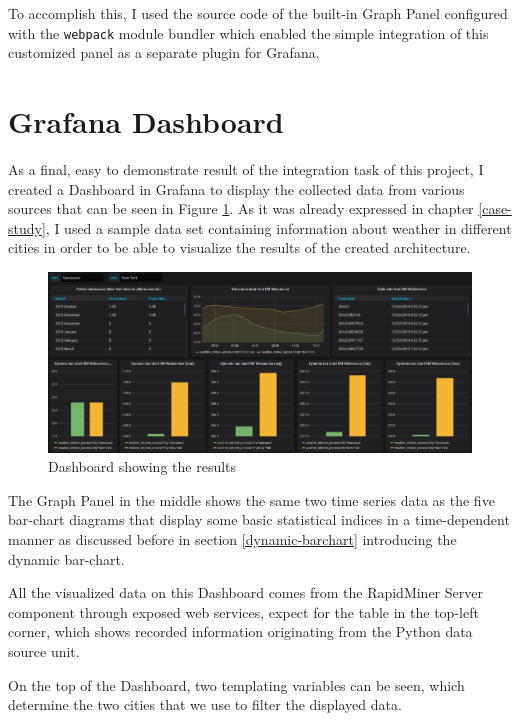 To accomplish this, I used the source code of the built-in Graph Panel configured with the \texttt{webpack} module bundler which enabled the simple integration of this customized panel as a separate plugin for Grafana. \cite{graph-panel-webpack}

\section{Grafana Dashboard} \label{final-dashboard}

As a final, easy to demonstrate result of the integration task of this project, I created a Dashboard in Grafana to display the collected data from various sources that can be seen in Figure \ref{fig:dashboard-final}. As it was already expressed in chapter \ref{case-study}, I used a sample data set containing information about weather in different cities in order to be able to visualize the results of the created architecture.

\begin{figure}[h]
	\centering
	\includegraphics[width=\linewidth, keepaspectratio]{figures/final-dashboard.png}
	\caption{Dashboard showing the results}
	\label{fig:dashboard-final}
\end{figure}

The Graph Panel in the middle shows the same two time series data as the five bar-chart diagrams that display some basic statistical indices in a time-dependent manner as discussed before in section \ref{dynamic-barchart} introducing the dynamic bar-chart.

All the visualized data on this Dashboard comes from the RapidMiner Server component through exposed web services, expect for the table in the top-left corner, which shows recorded information originating from the Python data source unit.

On the top of the Dashboard, two templating variables can be seen, which determine the two cities that we use to filter the displayed data.

